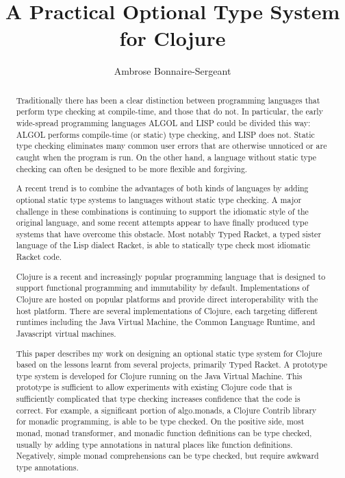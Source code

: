 \documentclass{cshonours}
\title{A Practical Optional Type System for Clojure}
\author{Ambrose Bonnaire-Sergeant}
\begin{document}
\maketitle

\begin{abstract}

Traditionally there has been a clear distinction between 
programming languages that perform type checking at compile-time, and those that do not.
In particular, the early wide-spread programming languages ALGOL and LISP
could be divided this way: ALGOL performs compile-time (or static) type checking,
and LISP does not.
Static type checking eliminates many common user errors that are otherwise unnoticed or are caught 
when the program is run.
On the other hand, a language without static type checking can often be designed 
to be more flexible and forgiving.

A recent trend is to combine the advantages of both kinds of languages by adding optional static 
type systems to languages without static type checking. 
A major challenge in these combinations is continuing to support the idiomatic style of the original 
language, and some recent attempts appear to have finally produced type systems that have overcome this obstacle.  
Most notably Typed Racket, a typed sister language of the Lisp dialect Racket, is able to statically type 
check most idiomatic Racket code.

Clojure is a recent and increasingly popular programming language that is designed to support 
functional programming and immutability by default. Implementations of Clojure are hosted 
on popular platforms and provide direct interoperability with the host platform.
There are several implementations of Clojure, each targeting different runtimes including
the Java Virtual Machine, the Common Language Runtime, and Javascript virtual machines.

This paper describes my work on designing an optional static type system for Clojure based on
the lessons learnt from several projects, primarily Typed Racket.
A prototype type system is developed for Clojure running on the Java Virtual Machine.
This prototype is sufficient to allow experiments with existing Clojure code that is sufficiently complicated
that type checking increases confidence that the code is correct.
For example, a significant portion of algo.monads, a Clojure Contrib library for monadic programming, 
is able to be type checked. 
On the positive side, most monad, monad transformer, and monadic function definitions can be type checked,
usually by adding type annotations in natural places like function definitions.
Negatively, simple monad comprehensions can be type checked, but require awkward type annotations.


\end{abstract}
\end{document}
